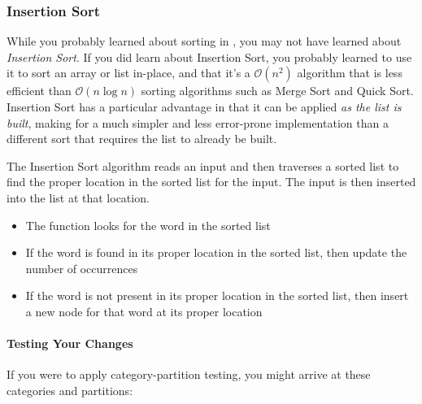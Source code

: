 \subsubsection{Insertion Sort}

While you probably learned about sorting in \cstwo, you may not have learned about \textit{Insertion Sort}.
If you did learn about Insertion Sort, you probably learned to use it to sort an array or list in-place, and that it's a $\mathcal{O}(n^2)$ algorithm that is less efficient than $\mathcal{O}(n \log n)$ sorting algorithms such as Merge Sort and Quick Sort.
Insertion Sort has a particular advantage in that it can be applied \textit{as the list is built}, making for a much simpler and less error-prone implementation than a different sort that requires the list to already be built.

The Insertion Sort algorithm reads an input and then traverses a sorted list to find the proper location in the sorted list for the input.
The input is then inserted into the list at that location.

\begin{description}
        \begin{itemize}
            \item The function looks for the word in the sorted list
            \item If the word is found in its proper location in the sorted list, then update the number of occurrences
            \item If the word is not present in its proper location in the sorted list, then insert a new node for that word at its proper location
        \end{itemize}
\end{description}

\paragraph{Testing Your Changes}

If you were to apply category-partition testing, you might arrive at these categories and partitions:

